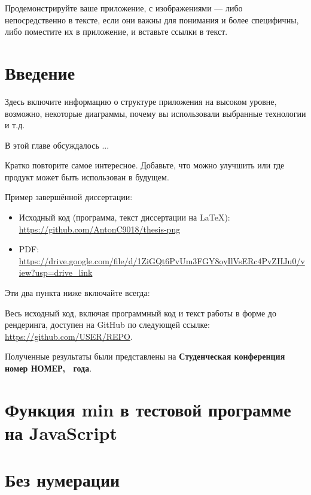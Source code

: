 \documentclass[a4paper,12pt]{report}
\newcommand{\yearOfWriting}{\the\year}
\newcommand{\conferencesList}{Студенческая конференция номер НОМЕР, \yearOfWriting~года}
\newcommand{\github}{\url{https://github.com/USER/REPO}}
\begin{document}
Продемонстрируйте ваше приложение, с изображениями — либо непосредственно в тексте,
если они важны для понимания и более специфичны,
либо поместите их в приложение, и вставьте ссылки в текст.

\section{Введение}

Здесь включите информацию о структуре приложения на высоком уровне,
возможно, некоторые диаграммы, почему вы использовали выбранные технологии и т.д.


В этой главе обсуждалось ...

\finalConclusionChapter

Кратко повторите самое интересное.
Добавьте, что можно улучшить или где продукт может быть использован в будущем.

Пример завершённой диссертации:
\begin{itemize}
  \item Исходный код (программа, текст диссертации на \LaTeX{}): \url{https://github.com/AntonC9018/thesis-png}
  \item PDF: \url{https://drive.google.com/file/d/1ZiGQt6PvUm3FGY8oyIlVsERc4PvZHJu0/view?usp=drive_link}
\end{itemize}

Эти два пункта ниже включайте всегда:

Весь исходный код, включая программный код и текст работы
в форме до рендеринга, доступен на GitHub по следующей ссылке: \github.

Полученные результаты были представлены на \textbf{\conferencesList}\cite{self}.

\bibliographyChapter

\appendixChapter

\section{Функция min в тестовой программе на JavaScript}\label{appendix:example_min}

\section{Без нумерации}\label{unnumbered_appendix}

\end{document}

